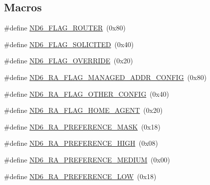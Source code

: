 \subsection*{Macros}
\begin{DoxyCompactItemize}
\item 
\#define \hyperlink{openmote-cc2538_2lwip_2src_2include_2lwip_2prot_2nd6_8h_af41135736265f32503ac2340dc2d3ad3}{N\+D6\+\_\+\+F\+L\+A\+G\+\_\+\+R\+O\+U\+T\+ER}~(0x80)
\item 
\#define \hyperlink{openmote-cc2538_2lwip_2src_2include_2lwip_2prot_2nd6_8h_ae6bf6657a8a6b004681948090dfa2d7c}{N\+D6\+\_\+\+F\+L\+A\+G\+\_\+\+S\+O\+L\+I\+C\+I\+T\+ED}~(0x40)
\item 
\#define \hyperlink{openmote-cc2538_2lwip_2src_2include_2lwip_2prot_2nd6_8h_a37fb4993bbbf3c4886291d38b1c03393}{N\+D6\+\_\+\+F\+L\+A\+G\+\_\+\+O\+V\+E\+R\+R\+I\+DE}~(0x20)
\item 
\#define \hyperlink{openmote-cc2538_2lwip_2src_2include_2lwip_2prot_2nd6_8h_a7fb1b330719d83b7525374f4beca51bc}{N\+D6\+\_\+\+R\+A\+\_\+\+F\+L\+A\+G\+\_\+\+M\+A\+N\+A\+G\+E\+D\+\_\+\+A\+D\+D\+R\+\_\+\+C\+O\+N\+F\+IG}~(0x80)
\item 
\#define \hyperlink{openmote-cc2538_2lwip_2src_2include_2lwip_2prot_2nd6_8h_a25c3846344db73334471f1a113999d82}{N\+D6\+\_\+\+R\+A\+\_\+\+F\+L\+A\+G\+\_\+\+O\+T\+H\+E\+R\+\_\+\+C\+O\+N\+F\+IG}~(0x40)
\item 
\#define \hyperlink{openmote-cc2538_2lwip_2src_2include_2lwip_2prot_2nd6_8h_a7867a2c9435975e56656c78bc3c8dcaa}{N\+D6\+\_\+\+R\+A\+\_\+\+F\+L\+A\+G\+\_\+\+H\+O\+M\+E\+\_\+\+A\+G\+E\+NT}~(0x20)
\item 
\#define \hyperlink{openmote-cc2538_2lwip_2src_2include_2lwip_2prot_2nd6_8h_a328acad71d1e71c00e413ab2df4af4de}{N\+D6\+\_\+\+R\+A\+\_\+\+P\+R\+E\+F\+E\+R\+E\+N\+C\+E\+\_\+\+M\+A\+SK}~(0x18)
\item 
\#define \hyperlink{openmote-cc2538_2lwip_2src_2include_2lwip_2prot_2nd6_8h_a63a5d0b59f2e493f04cb1df2d1495484}{N\+D6\+\_\+\+R\+A\+\_\+\+P\+R\+E\+F\+E\+R\+E\+N\+C\+E\+\_\+\+H\+I\+GH}~(0x08)
\item 
\#define \hyperlink{openmote-cc2538_2lwip_2src_2include_2lwip_2prot_2nd6_8h_aeee05b7e05eaed56fec06b1bb7e263dd}{N\+D6\+\_\+\+R\+A\+\_\+\+P\+R\+E\+F\+E\+R\+E\+N\+C\+E\+\_\+\+M\+E\+D\+I\+UM}~(0x00)
\item 
\#define \hyperlink{openmote-cc2538_2lwip_2src_2include_2lwip_2prot_2nd6_8h_ab53c89ac0b858537e224797f924aa7bf}{N\+D6\+\_\+\+R\+A\+\_\+\+P\+R\+E\+F\+E\+R\+E\+N\+C\+E\+\_\+\+L\+OW}~(0x18)
\item 

\end{DoxyCompactItemize}
